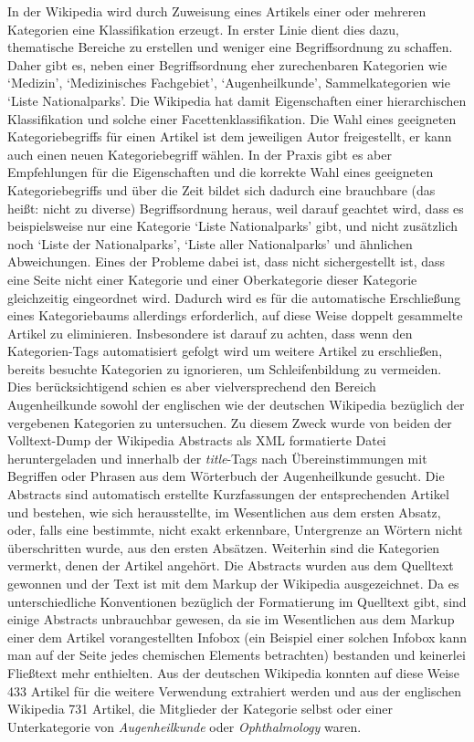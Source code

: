 \documentclass[pagesize,DIV=calc,12pt,draft]{scrreprt}
\begin{document}
In der Wikipedia wird durch Zuweisung eines Artikels einer oder mehreren Kategorien eine Klassifikation erzeugt. 
In erster Linie dient dies dazu, thematische Bereiche zu erstellen und weniger eine Begriffsordnung zu schaffen. 
Daher gibt es, neben einer Begriffsordnung eher zurechenbaren Kategorien wie `Medizin', `Medizinisches Fachgebiet', `Augenheilkunde', Sammelkategorien wie `Liste Nationalparks'. 
Die Wikipedia hat damit Eigenschaften einer hierarchischen Klassifikation und solche einer Facettenklassifikation. 
Die Wahl eines geeigneten Kategoriebegriffs für einen Artikel ist dem jeweiligen Autor freigestellt, er kann auch einen neuen Kategoriebegriff wählen. 
In der Praxis gibt es aber Empfehlungen für die Eigenschaften und die korrekte Wahl eines geeigneten Kategoriebegriffs und über die Zeit bildet sich dadurch eine brauchbare (das heißt: nicht zu diverse) Begriffsordnung heraus, weil darauf geachtet wird, dass es beispielsweise nur eine Kategorie `Liste Nationalparks' gibt, und nicht zusätzlich noch `Liste der Nationalparks', `Liste aller Nationalparks' und ähnlichen Abweichungen. 
Eines der Probleme dabei ist, dass nicht sichergestellt ist, dass eine Seite nicht einer Kategorie und einer Oberkategorie dieser Kategorie gleichzeitig eingeordnet wird. 
Dadurch wird es für die automatische Erschließung eines Kategoriebaums allerdings erforderlich, auf diese Weise doppelt gesammelte Artikel zu eliminieren. 
Insbesondere ist darauf zu achten, dass wenn den Kategorien-Tags automatisiert gefolgt wird um weitere Artikel zu erschließen, bereits besuchte Kategorien zu ignorieren, um Schleifenbildung zu vermeiden. 
Dies berücksichtigend schien es aber vielversprechend den Bereich Augenheilkunde sowohl der englischen wie der deutschen Wikipedia bezüglich der vergebenen Kategorien zu untersuchen. 
Zu diesem Zweck wurde von beiden der Volltext-Dump der Wikipedia Abstracts als XML formatierte Datei heruntergeladen und innerhalb der \emph{title}-Tags nach Übereinstimmungen mit Begriffen oder Phrasen aus dem Wörterbuch der Augenheilkunde gesucht. 
Die Abstracts sind automatisch erstellte Kurzfassungen der entsprechenden Artikel und bestehen, wie sich herausstellte, im Wesentlichen aus dem ersten Absatz, oder, falls eine bestimmte, nicht exakt erkennbare, Untergrenze an Wörtern nicht überschritten wurde, aus den ersten Absätzen. 
Weiterhin sind die Kategorien vermerkt, denen der Artikel angehört. 
Die Abstracts wurden aus dem Quelltext gewonnen und der Text ist mit dem Markup der Wikipedia ausgezeichnet. 
Da es unterschiedliche Konventionen bezüglich der Formatierung im Quelltext gibt, sind einige Abstracts unbrauchbar gewesen, da sie im Wesentlichen aus dem Markup einer dem Artikel vorangestellten Infobox (ein Beispiel einer solchen Infobox kann man auf der Seite jedes chemischen Elements betrachten) bestanden und keinerlei Fließtext mehr enthielten. 
Aus der deutschen Wikipedia konnten auf diese Weise 433 Artikel für die weitere Verwendung extrahiert werden und aus der englischen Wikipedia 731 Artikel, die Mitglieder der Kategorie selbst oder einer Unterkategorie von \emph{Augenheilkunde} oder \emph{Ophthalmology} waren. 
\end{document}

